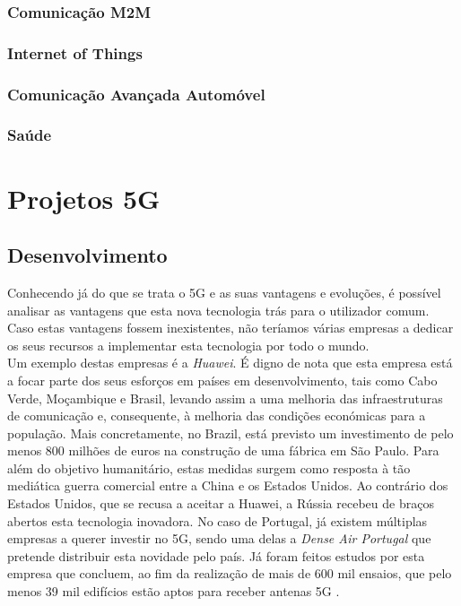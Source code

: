 \documentclass{llncs}
\begin{document}
\subsubsection{Comunicação M2M}
\subsubsection{Internet of Things}
\subsubsection{Comunicação Avançada Automóvel}
\subsubsection{Saúde}
\section{Projetos 5G}
\subsection{Desenvolvimento}
Conhecendo já do que se trata o 5G e as suas vantagens e evoluções,
é possível analisar as vantagens que esta nova tecnologia trás para
o utilizador comum.\\
Caso estas vantagens fossem inexistentes, não teríamos várias empresas
a dedicar os seus recursos a implementar esta tecnologia por todo o 
mundo.\\
Um exemplo destas empresas é a \textit{Huawei}.
É digno de nota que esta empresa está a focar parte dos seus esforços 
em países em desenvolvimento, tais como Cabo Verde, Moçambique e 
Brasil, levando assim a uma melhoria das infraestruturas de 
comunicação e, consequente, à melhoria das condições económicas para a
população. Mais concretamente, no Brazil, está previsto um
investimento de pelo menos 800 milhões de euros na construção de uma 
fábrica em São Paulo. Para além do objetivo humanitário, estas medidas
surgem como resposta à tão mediática guerra comercial entre a China e
os Estados Unidos.
Ao contrário dos Estados Unidos, que se recusa a aceitar a Huawei, a
Rússia recebeu de braços abertos esta tecnologia inovadora.
No caso de Portugal, já existem múltiplas empresas a querer investir
no 5G, sendo uma delas a \textit{Dense Air Portugal} que pretende
distribuir esta novidade pelo país.
Já foram feitos estudos por esta empresa que concluem, ao fim da
realização de mais de 600 mil ensaios, que pelo menos 39 mil edifícios
estão aptos para receber antenas 5G \cite{5GPortugal}.
\end{document}
